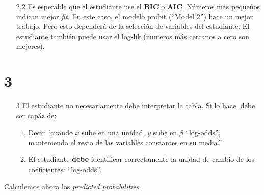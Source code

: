 \documentclass[onesided]{article}\usepackage[]{graphicx}\usepackage[]{color}
\begin{document}
\begin{enumerate}
\item[$2.2$] Es esperable que el estudiante use el {\bf BIC} o {\bf AIC}. N\'umeros m\'as peque\~nos indican mejor \emph{fit}. En este caso, el modelo probit (``Model 2'') hace un mejor trabajo. Pero esto depender\'a de la selecci\'on de variables del estudiante. El estudiante tambi\'en puede usar el log-lik (numeros m\'as cercanos a cero son mejores).
\end{enumerate}

\section{3}

\begin{enumerate}
\item[$3$] El estudiante no necesariamente debe interpretar la tabla. Si lo hace, debe ser cap\'az de:
  \begin{enumerate}
    \item Decir ``cuando $x$ sube en una unidad, $y$ sube en $\beta$ ``log-odds'', manteniendo el resto de las variables constantes en su media.''
    \item El estudiante {\bf debe} identificar correctamente la unidad de cambio de los coeficientes: ``log-odds''.
  \end{enumerate}
\end{enumerate}

Calculemos ahora los \emph{predicted probabilities}. 
\end{document}
